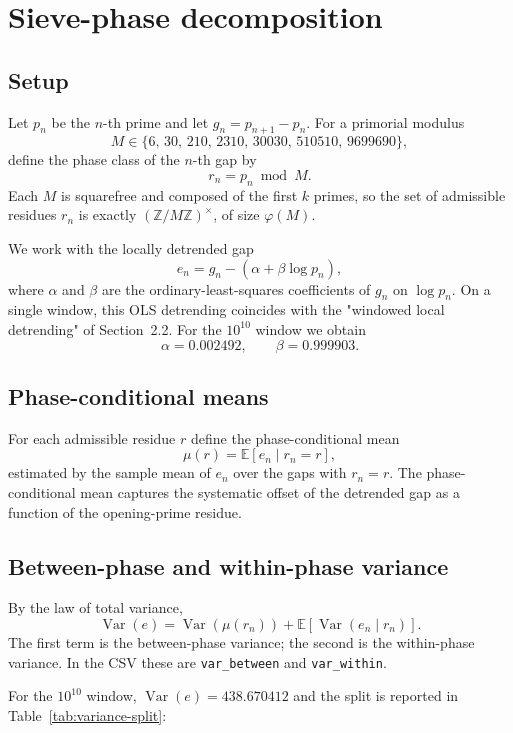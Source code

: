 \section{Sieve-phase decomposition}

\subsection{Setup}

Let $p_n$ be the $n$-th prime and let $g_n = p_{n+1}-p_n$. For a primorial modulus
\[
M \in \{6,\,30,\,210,\,2310,\,30030,\,510510,\,9699690\},
\]
define the phase class of the $n$-th gap by
\[
r_n = p_n \bmod M.
\]
Each $M$ is squarefree and composed of the first $k$ primes, so the set of admissible residues $r_n$ is exactly $(\mathbb{Z}/M\mathbb{Z})^\times$, of size $\varphi(M)$.

We work with the locally detrended gap
\[
e_n = g_n - (\alpha + \beta \log p_n),
\]
where $\alpha$ and $\beta$ are the ordinary-least-squares coefficients of $g_n$ on $\log p_n$. On a single window, this OLS detrending coincides with the "windowed local detrending" of Section~2.2. For the $10^{10}$ window we obtain
\[
\alpha = 0.002492,\qquad \beta = 0.999903.
\]

\subsection{Phase-conditional means}

For each admissible residue $r$ define the phase-conditional mean
\[
\mu(r) = \mathbb{E}\!\left[e_n \mid r_n = r\right],
\]
estimated by the sample mean of $e_n$ over the gaps with $r_n = r$. The phase-conditional mean captures the systematic offset of the detrended gap as a function of the opening-prime residue.

\subsection{Between-phase and within-phase variance}

By the law of total variance,
\[
\operatorname{Var}(e) = \operatorname{Var}(\mu(r_n)) + \mathbb{E}\!\left[\operatorname{Var}(e_n \mid r_n)\right].
\]
The first term is the between-phase variance; the second is the within-phase variance. In the CSV these are \texttt{var\_between} and \texttt{var\_within}.

For the $10^{10}$ window, $\operatorname{Var}(e) = 438.670412$ and the split is reported in Table~\ref{tab:variance-split}:


